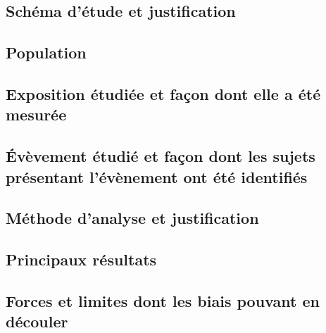 \documentclass[10pt]{article}
\begin{document}
\subsection{Schéma d'étude et justification}

\subsection{Population}

\subsection{Exposition étudiée et façon dont elle a été mesurée}

\subsection{\'{E}vèvement étudié et façon dont les sujets présentant l'évènement ont été identifiés}

\subsection{Méthode d'analyse et justification}

\subsection{Principaux résultats}

\subsection{Forces et limites dont les biais pouvant en découler}
\end{document}

